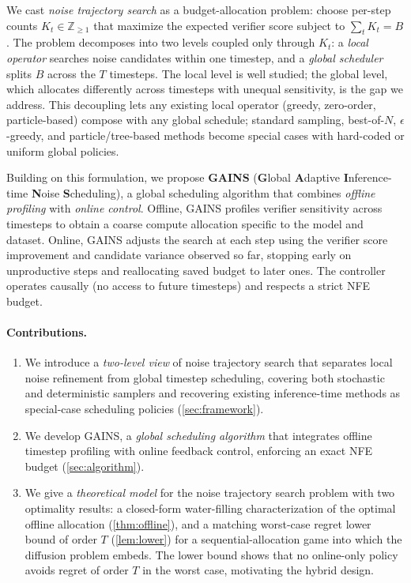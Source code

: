 We cast \emph{noise trajectory search} as a budget-allocation problem: choose per-step counts $K_t \in \mathbb{Z}_{\ge 1}$ that maximize the expected verifier score subject to $\sum_t K_t = B$. The problem decomposes into two levels coupled only through $K_t$: a \emph{local operator} searches noise candidates within one timestep, and a \emph{global scheduler} splits $B$ across the $T$ timesteps. The local level is well studied; the global level, which allocates differently across timesteps with unequal sensitivity, is the gap we address. This decoupling lets any existing local operator (greedy, zero-order, particle-based) compose with any global schedule; standard sampling, best-of-$N$, $\epsilon$-greedy, and particle/tree-based methods become special cases with hard-coded or uniform global policies.

Building on this formulation, we propose \textbf{\textsc{GAINS}} (\textbf{G}lobal \textbf{A}daptive \textbf{I}nference-time \textbf{N}oise \textbf{S}cheduling), a global scheduling algorithm that combines \emph{offline profiling} with \emph{online control}.
Offline, \textsc{GAINS} profiles verifier sensitivity across timesteps to obtain a coarse compute allocation specific to the model and dataset.
Online, \textsc{GAINS} adjusts the search at each step using the verifier score improvement and candidate variance observed so far, stopping early on unproductive steps and reallocating saved budget to later ones.
The controller operates causally (no access to future timesteps) and respects a strict NFE budget.

\paragraph{Contributions.}
\begin{enumerate}
\item We introduce a \emph{two-level view} of noise trajectory search that separates local noise refinement from global timestep scheduling, covering both stochastic and deterministic samplers and recovering existing inference-time methods as special-case scheduling policies (\cref{sec:framework}).
\item We develop \textsc{GAINS}, a \emph{global scheduling algorithm} that integrates offline timestep profiling with online feedback control, enforcing an exact NFE budget (\cref{sec:algorithm}).
\item We give a \emph{theoretical model} for the noise trajectory search problem with two optimality results: a closed-form water-filling characterization of the optimal offline allocation (\cref{thm:offline}), and a matching worst-case regret lower bound of order $T$ (\cref{lem:lower}) for a sequential-allocation game into which the diffusion problem embeds. The lower bound shows that no online-only policy avoids regret of order $T$ in the worst case, motivating the hybrid design.
\end{enumerate}

